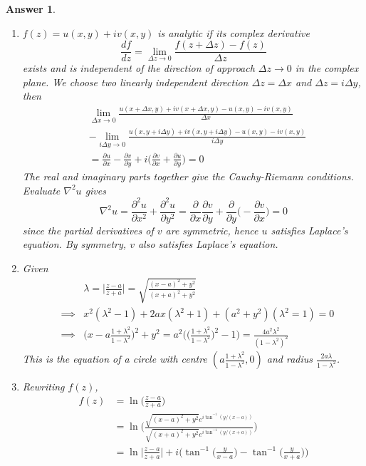 \documentclass[a4paper]{article}
\newtheorem{ans}{Answer}[section]
\theoremstyle{new}
\begin{document}
\begin{ans}\leavevmode
\begin{enumerate}[label=(\roman*)]
\item $f(z)=u(x,y)+iv(x,y)$ is analytic if its complex derivative
$$\frac{df}{dz}=\lim_{\Delta z\rightarrow0}\frac{f(z+\Delta z)-f(z)}{\Delta z}$$
exists and is independent of the direction of approach $\Delta z\rightarrow 0$ in the complex plane. We choose two linearly independent direction $\Delta z=\Delta x$ and $\Delta z=i\Delta y$, then
\begin{align}
    &\lim_{\Delta x\rightarrow 0}\frac{u(x+\Delta x,y)+iv(x+\Delta x,y)-u(x,y)-iv(x,y)}{\Delta x}\nonumber\\&-\lim_{i\Delta y\rightarrow0}\frac{u(x,y+i\Delta y)+iv(x,y+i\Delta y)-u(x,y)-iv(x,y)}{i\Delta y}\nonumber\\&=\frac{\partial u}{\partial x}-\frac{\partial v}{\partial y}+i\bigg(\frac{\partial v}{\partial x}+\frac{\partial u}{\partial y}\bigg)=0\nonumber
\end{align}
The real and imaginary parts together give the Cauchy-Riemann conditions. Evaluate $\nabla^2u$ gives
$$\nabla^2u=\frac{\partial^2u}{\partial x^2}+\frac{\partial^2u}{\partial y^2}=\frac{\partial}{\partial x}\frac{\partial v}{\partial y}+\frac{\partial}{\partial y}\bigg(-\frac{\partial v}{\partial x}\bigg)=0$$
since the partial derivatives of $v$ are symmetric, hence $u$ satisfies Laplace's equation. By symmetry, $v$ also satisfies Laplace's equation.
\item Given
\begin{eqnarray}
&&\lambda=\bigg|\frac{z-a}{z+a}\bigg|=\sqrt{\frac{(x-a)^2+y^2}{(x+a)^2+y^2}}\nonumber\\&\implies& x^2(\lambda^2-1)+2ax(\lambda^2+1)+(a^2+y^2)(\lambda^2=1)=0\nonumber\\&\implies&\bigg(x-a\frac{1+\lambda^2}{1-\lambda^2}\bigg)^2+y^2=a^2\bigg(\bigg(\frac{1+\lambda^2}{1-\lambda^2}\bigg)^2-1\bigg)=\frac{4a^2\lambda^2}{(1-\lambda^2)^2}\nonumber
\end{eqnarray}
This is the equation of a circle with centre $(a\frac{1+\lambda^2}{1-\lambda^2},0)$ and radius $\frac{2a\lambda}{1-\lambda^2}$.
\item Rewriting $f(z)$,
\begin{align}
f(z)&=\ln\bigg(\frac{z-a}{z+a}\bigg)\nonumber\\&=\ln\bigg(\frac{\sqrt{(x-a)^2+y^2}e^{i\tan^{-1}(y/(x-a))}}{\sqrt{(x+a)^2+y^2}e^{i\tan^{-1}(y/(x+a))}}\bigg)\nonumber\\&=\ln\bigg|\frac{z-a}{z+a}\bigg|+i\bigg(\tan^{-1}\bigg(\frac{y}{x-a}\bigg)-\tan^{-1}\bigg(\frac{y}{x+a}\bigg)\bigg)\nonumber

\end{align}
\end{enumerate}
\end{ans}
\end{document}
